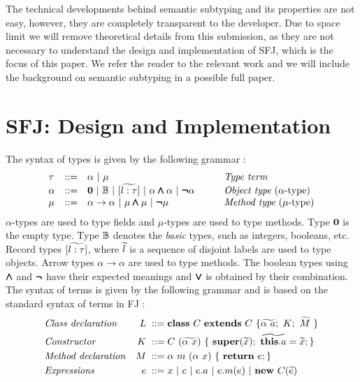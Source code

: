 \documentclass[runningheads]{llncs}
\begin{document}
The technical developments behind semantic subtyping and its properties are not easy, however, they are completely transparent to the developer.
Due to space limit we will remove theoretical details from this submission, as they are not necessary to understand the design and implementation of SFJ, which is the focus of this paper. We refer the reader to the relevant work \cite{Dardha2013,Dardha2017} and we will include the background on semantic subtyping in a possible full paper.


\section{SFJ: Design and Implementation}
\label{sec:design}
The syntax of types is given by the following grammar \cite{Dardha2013,Dardha2017}:
$$
\begin{array}{llll}
\tau & ::= & \alpha \ |\ \mu
& \mbox{{\em Type term}}
\\
\alpha & ::=  & \zero \ |\ \btypes \ |\ [\wt{l:\tau}] \ |\ \alpha \synwedge \alpha \ |\ \synneg\alpha
\qquad
& \mbox{{\em Object type} ($\alpha $-type)}
\\
\mu & ::=  & \alpha \to \alpha \ |\ \mu \synwedge \mu \ |\ \synneg\mu
& \mbox{{\em Method type} ($\mu $-type)}
\end{array}
$$
$\alpha$-types are used to type fields and $\mu$-types are used to type methods.
Type $\mathbf{0}$ is the empty type.
Type ${\mathbb B}$ denotes the \emph{basic} types, such as integers, booleans, etc.
{Record} types $[\widetilde{l:\tau}]$, where $\widetilde{l}$ is a sequence of disjoint labels are used to type objects.
Arrow types $\alpha \to \alpha$ are used to type methods.
The boolean types using $\pmb{\wedge}$ and $\pmb{\neg}$ have their expected meanings and $\pmb{\vee}$ is obtained by their combination.\\
The syntax of terms is given by the following grammar and is based on the standard syntax of terms in FJ \cite{featherweight,Dardha2013,Dardha2017}:
\begin{align*}
& \mbox{\textit{Class declaration}} & L \; ::= \; & \syndecl{C}{C}{\wt{\alpha \ a};\ K; \ \wt{M}\ }\\
& \mbox{\textit{Constructor}} & K \;::=\; & C\ (\wt{\alpha\ x})\ \{\ \synsuper(\wt{x});\ \wt{\synthis.a}=\wt{x}; \}\\
& \mbox{\textit{Method declaration}} & M \; ::= \; & \alpha \ m\ (\alpha \ x)\ \{\ \synret e; \} \\
& \mbox{\textit{Expressions}} & e \; ::=\; & x\ |\  c\ |\ e.a\ |\ e.m(e) \ | \ \synnew C(\wt{e})
\end{align*}
\end{document}
